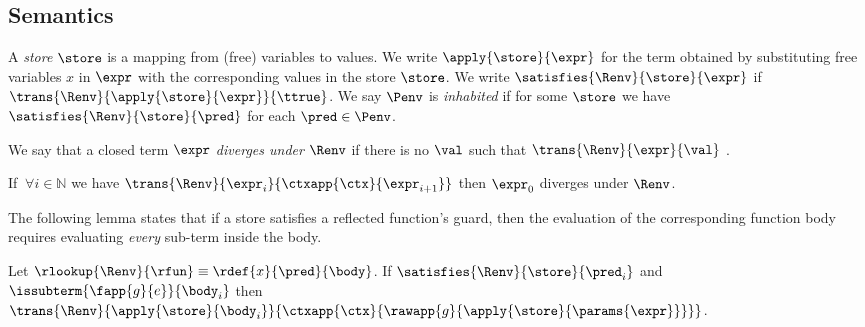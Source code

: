 \newcommand\nats{\ensuremath{\mathbb{N}}}


\subsection{Semantics}\label{sec:pbe:semantics}

%
A \emph{store} $\store$ is a mapping from
(free) variables to values.
%
We write $\apply{\store}{\expr}$ for the term
obtained by substituting free variables $x$
in $\expr$ with the corresponding values in
the store $\store$.
%
We write $\satisfies{\Renv}{\store}{\expr}$
if $\trans{\Renv}{\apply{\store}{\expr}}{\ttrue}$.
%
We say $\Penv$ is \emph{inhabited}
if for some $\store$ we have
$\satisfies{\Renv}{\store}{\pred}$
for each $\pred \in \Penv$.


%
We say that a closed term $\expr$
\emph{diverges under} $\Renv$ if
there is no $\val$ such that
$\trans{\Renv}{\expr}{\val}$ .

\begin{lemma} \label{lem:div} %
If $\ \forall i \in \nats$ we have
$\trans{\Renv}{\expr_i}{\ctxapp{\ctx}{\expr_{i+1}}}$
then $\expr_0$ diverges under $\Renv$.
\end{lemma}

%
The following lemma states that
if a store satisfies a reflected
function's guard, then the evaluation
of the corresponding function body
requires evaluating \emph{every}
sub-term inside the body.

\begin{lemma}\label{lem:subterm-eval}
Let $\rlookup{\Renv}{\rfun} \equiv \rdef{x}{\pred}{\body}$.
%
If $\satisfies{\Renv}{\store}{\pred_i}$ and $\issubterm{\fapp{g}{e}}{\body_i}$
then
$\trans{\Renv}{\apply{\store}{\body_i}}
              {\ctxapp{\ctx}{\rawapp{g}{\apply{\store}{\params{\expr}}}}}$.
\end{lemma}

